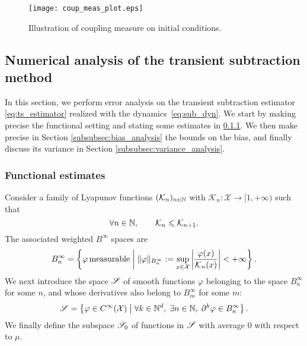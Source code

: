\begin{figure}%
	\centering
	\texttt{[image: coup\_meas\_plot.eps]}
	\caption{Illustration of coupling measure on initial conditions.}
	\label{fig:coup_meas_mock}
\end{figure}

\subsection{Numerical analysis of the transient subtraction method}
\label{subsec:num_anal_ts}
%
In this section, we perform error analysis on the transient subtraction estimator \eqref{eq:ts_estimator} realized with the dynamics~\eqref{eq:sub_dyn}. We start by making precise the functional setting and stating some estimates in \cref{subsubsec:lyapunov_setting}. We then make precise in Section \ref{subsubsec:bias_analysis} the bounds on the bias, and finally discuss its variance in Section \ref{subsubsec:variance_analysis}.

\subsubsection{Functional estimates}
\label{subsubsec:lyapunov_setting}
%
Consider a family of Lyapunov functions $(\mathcal{K}_n)_{n\in\N}$ with $\mathcal{K}_n \colon \mathcal{X} \to [1,+\infty)$ such that
%
\begin{equation}
	\forall n\in\N, \qquad \mathcal{K}_n \leq \mathcal{K}_{n+1}.
\end{equation}
%
The associated weighted $B^\infty$ spaces are
%
\begin{equation}
    B_n^\infty = \left\{\varphi \, \rm{measurable} \; \middle| \; \|\varphi\|_{B_n^\infty} := \sup _{x \in \mathcal{X}}\left| \frac{\varphi(x)}{\mathcal{K}_n(x)} \right| < +\infty\right\}.
\end{equation}
%
We next introduce the space $\S$ of smooth functions $\varphi$ belonging to the space $B^\infty_n$ for some $n$, and whose derivatives also belong to $B^\infty_m$ for some $m$:
%
\begin{equation}
    \S = \left\{\varphi \in C^\infty(\mathcal{X}) \; \middle| \; \forall k \in \mathbb{N}^d, \; \exists n \in \mathbb{N}, \; \partial^k \varphi \in B_n^\infty\right\}.
\end{equation}
%
We finally define the subspace $\S_0$ of functions in $\S$ with average 0 with respect to $\mu$.

